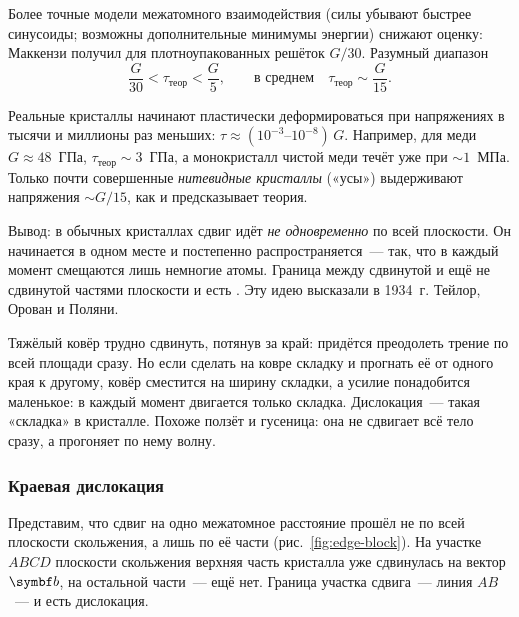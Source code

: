 Более точные модели межатомного взаимодействия (силы убывают быстрее
синусоиды; возможны дополнительные минимумы энергии) снижают оценку:
Маккензи получил для плотноупакованных решёток $G/30$. Разумный диапазон
\[
\frac G{30}<\tau_{\text{теор}}<\frac G5,\qquad\text{в среднем}\quad\tau_{\text{теор}}\sim\frac G{15}.
\]

\begin{glavnoe}
Реальные кристаллы начинают пластически деформироваться при напряжениях
в тысячи и миллионы раз меньших: $\tau\approx(10^{-3}\text{--}10^{-8})\,G$.
Например, для меди $G\approx48$~ГПа, $\tau_{\text{теор}}\sim3$~ГПа, а
монокристалл чистой меди течёт уже при $\sim1$~МПа. Только почти
совершенные \emph{нитевидные кристаллы} («усы») выдерживают напряжения
$\sim G/15$, как и предсказывает теория.
\end{glavnoe}

Вывод: в обычных кристаллах сдвиг идёт \emph{не одновременно} по всей
плоскости. Он начинается в одном месте и постепенно распространяется~—
так, что в каждый момент смещаются лишь немногие атомы. Граница между
сдвинутой и ещё не сдвинутой частями плоскости и есть
. Эту идею высказали в 1934~г. Тейлор, Орован и Поляни.

\begin{smysl}
Тяжёлый ковёр трудно сдвинуть, потянув за край: придётся преодолеть
трение по всей площади сразу. Но если сделать на ковре складку и
прогнать её от одного края к другому, ковёр сместится на ширину складки,
а усилие понадобится маленькое: в каждый момент двигается только
складка. Дислокация~— такая «складка» в кристалле. Похоже ползёт и
гусеница: она не сдвигает всё тело сразу, а прогоняет по нему волну.
\end{smysl}

\subsubsection{Краевая дислокация}

Представим, что сдвиг на одно межатомное расстояние прошёл не по всей
плоскости скольжения, а лишь по её части (рис.~\ref{fig:edge-block}).
На участке $ABCD$ плоскости скольжения верхняя часть кристалла уже
сдвинулась на вектор $\vb b$, на остальной части~— ещё нет. Граница
участка сдвига~— линия $AB$~— и есть дислокация.

